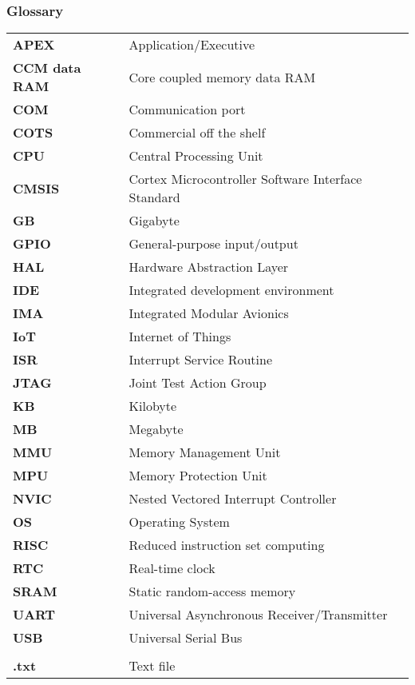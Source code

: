 \subsubsection*{Glossary}
\begin{longtable}{l p{12cm}}
\textbf{APEX}		& \qquad \qquad Application/Executive\\
\textbf{CCM data RAM}	& \qquad \qquad Core coupled memory data RAM\\
\textbf{COM}		& \qquad \qquad Communication port\\
\textbf{COTS}		& \qquad \qquad Commercial off the shelf\\
\textbf{CPU}		& \qquad \qquad Central Processing Unit\\
\textbf{CMSIS}		& \qquad \qquad Cortex Microcontroller Software Interface Standard\\
\textbf{GB}			& \qquad \qquad Gigabyte\\
\textbf{GPIO}		& \qquad \qquad General-purpose input/output\\
\textbf{HAL}		& \qquad \qquad Hardware Abstraction Layer\\
\textbf{IDE}		& \qquad \qquad Integrated development environment\\
\textbf{IMA}		& \qquad \qquad Integrated Modular Avionics\\
\textbf{IoT}		& \qquad \qquad Internet of Things\\
\textbf{ISR}		& \qquad \qquad Interrupt Service Routine\\
\textbf{JTAG}		& \qquad \qquad Joint Test Action Group\\
\textbf{KB}			& \qquad \qquad Kilobyte\\
\textbf{MB}			& \qquad \qquad Megabyte\\
\textbf{MMU}		& \qquad \qquad Memory Management Unit\\
\textbf{MPU}		& \qquad \qquad Memory Protection Unit\\
\textbf{NVIC}		& \qquad \qquad Nested Vectored Interrupt Controller\\
\textbf{OS}			& \qquad \qquad Operating System\\
\textbf{RISC}		& \qquad \qquad Reduced instruction set computing\\
\textbf{RTC}		& \qquad \qquad Real-time clock\\
\textbf{SRAM}		& \qquad \qquad Static random-access memory\\
\textbf{UART}		& \qquad \qquad Universal Asynchronous Receiver/Transmitter\\
\textbf{USB}		& \qquad \qquad Universal Serial Bus\\
					& \\
\textbf{.txt}		& \qquad \qquad Text file\\

\end{longtable}
